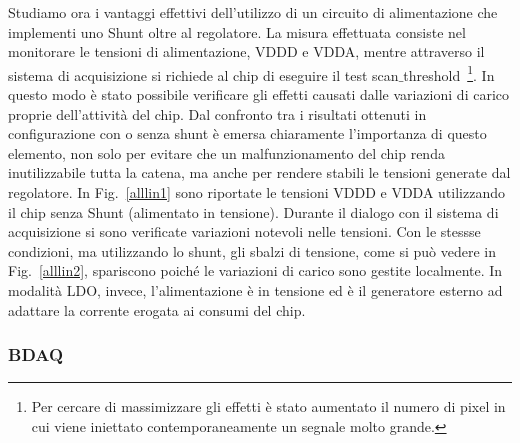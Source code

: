 Studiamo ora i vantaggi effettivi dell'utilizzo di un circuito di alimentazione che implementi uno Shunt oltre al regolatore.
La misura effettuata consiste nel monitorare le tensioni di alimentazione, VDDD e VDDA, mentre attraverso il sistema di acquisizione si richiede al chip di eseguire il test scan$\_$threshold~\footnote{
  Per cercare di massimizzare gli effetti è stato aumentato il numero di pixel in cui viene iniettato contemporaneamente un segnale molto grande.
}.
In questo modo è stato possibile verificare gli effetti causati dalle variazioni di carico proprie dell'attività del chip.
Dal confronto tra i risultati ottenuti in configurazione con o senza shunt è emersa chiaramente l'importanza di questo elemento, non solo per evitare che un malfunzionamento del chip renda inutilizzabile tutta la catena, ma anche per rendere stabili le tensioni generate dal regolatore. 
In Fig.~\ref{alllin1} sono riportate le tensioni VDDD e VDDA utilizzando il chip senza Shunt (alimentato in tensione).
Durante il dialogo con il sistema di acquisizione si sono verificate variazioni notevoli nelle tensioni.
Con le stessse condizioni, ma utilizzando lo shunt, gli sbalzi di tensione, come si può vedere in Fig.~\ref{alllin2}, spariscono poiché le variazioni di carico sono gestite localmente.
In modalità LDO, invece, l'alimentazione è in tensione ed è il generatore esterno ad adattare la corrente erogata ai consumi del chip.


\subsubsection{BDAQ}

